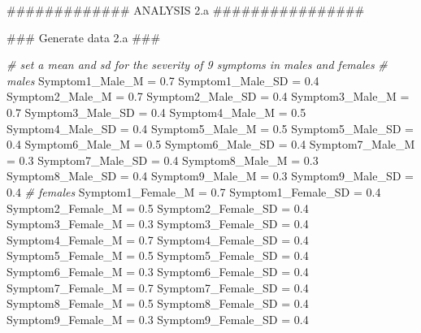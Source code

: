\documentclass[]{article}
\newenvironment{Shaded}{\begin{snugshade}}{\end{snugshade}}
\newcommand{\FloatTok}[1]{\textcolor[rgb]{0.00,0.00,0.81}{#1}}
\newcommand{\StringTok}[1]{\textcolor[rgb]{0.31,0.60,0.02}{#1}}
\newcommand{\CommentTok}[1]{\textcolor[rgb]{0.56,0.35,0.01}{\textit{#1}}}
\newcommand{\AlertTok}[1]{\textcolor[rgb]{0.94,0.16,0.16}{#1}}
\newcommand{\NormalTok}[1]{#1}
\begin{document}
\begin{Shaded}
\begin{Highlighting}[]
\NormalTok{############# ANALYSIS 2.a ################}

\NormalTok{### Generate data 2.a }\AlertTok{###}

\CommentTok{# set a mean and sd for the severity of 9 symptoms in males and females}
\CommentTok{# males}
\NormalTok{Symptom1_Male_M =}\StringTok{ }\FloatTok{0.7}
\NormalTok{Symptom1_Male_SD =}\StringTok{ }\FloatTok{0.4}
\NormalTok{Symptom2_Male_M =}\StringTok{ }\FloatTok{0.7}
\NormalTok{Symptom2_Male_SD =}\StringTok{ }\FloatTok{0.4}
\NormalTok{Symptom3_Male_M =}\StringTok{ }\FloatTok{0.7}
\NormalTok{Symptom3_Male_SD =}\StringTok{ }\FloatTok{0.4}
\NormalTok{Symptom4_Male_M =}\StringTok{ }\FloatTok{0.5}
\NormalTok{Symptom4_Male_SD =}\StringTok{ }\FloatTok{0.4}
\NormalTok{Symptom5_Male_M =}\StringTok{ }\FloatTok{0.5}
\NormalTok{Symptom5_Male_SD =}\StringTok{ }\FloatTok{0.4}
\NormalTok{Symptom6_Male_M =}\StringTok{ }\FloatTok{0.5}
\NormalTok{Symptom6_Male_SD =}\StringTok{ }\FloatTok{0.4}
\NormalTok{Symptom7_Male_M =}\StringTok{ }\FloatTok{0.3}
\NormalTok{Symptom7_Male_SD =}\StringTok{ }\FloatTok{0.4}
\NormalTok{Symptom8_Male_M =}\StringTok{ }\FloatTok{0.3}
\NormalTok{Symptom8_Male_SD =}\StringTok{ }\FloatTok{0.4}
\NormalTok{Symptom9_Male_M =}\StringTok{ }\FloatTok{0.3}
\NormalTok{Symptom9_Male_SD =}\StringTok{ }\FloatTok{0.4}
\CommentTok{# females}
\NormalTok{Symptom1_Female_M =}\StringTok{ }\FloatTok{0.7}
\NormalTok{Symptom1_Female_SD =}\StringTok{ }\FloatTok{0.4}
\NormalTok{Symptom2_Female_M =}\StringTok{ }\FloatTok{0.5}
\NormalTok{Symptom2_Female_SD =}\StringTok{ }\FloatTok{0.4}
\NormalTok{Symptom3_Female_M =}\StringTok{ }\FloatTok{0.3}
\NormalTok{Symptom3_Female_SD =}\StringTok{ }\FloatTok{0.4}
\NormalTok{Symptom4_Female_M =}\StringTok{ }\FloatTok{0.7}
\NormalTok{Symptom4_Female_SD =}\StringTok{ }\FloatTok{0.4}
\NormalTok{Symptom5_Female_M =}\StringTok{ }\FloatTok{0.5}
\NormalTok{Symptom5_Female_SD =}\StringTok{ }\FloatTok{0.4}
\NormalTok{Symptom6_Female_M =}\StringTok{ }\FloatTok{0.3}
\NormalTok{Symptom6_Female_SD =}\StringTok{ }\FloatTok{0.4}
\NormalTok{Symptom7_Female_M =}\StringTok{ }\FloatTok{0.7}
\NormalTok{Symptom7_Female_SD =}\StringTok{ }\FloatTok{0.4}
\NormalTok{Symptom8_Female_M =}\StringTok{ }\FloatTok{0.5}
\NormalTok{Symptom8_Female_SD =}\StringTok{ }\FloatTok{0.4}
\NormalTok{Symptom9_Female_M =}\StringTok{ }\FloatTok{0.3}
\NormalTok{Symptom9_Female_SD =}\StringTok{ }\FloatTok{0.4}


\end{Highlighting}
\end{Shaded}
\end{document}
